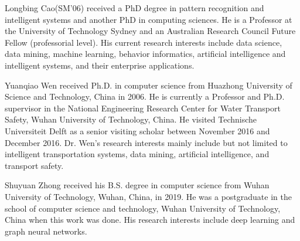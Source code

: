 \documentclass[journal]{IEEEtran}
\begin{document}
\begin{IEEEbiography}{Longbing Cao}(SM'06) received a PhD degree in pattern recognition and intelligent systems and another PhD in computing sciences. He is a Professor at the University of Technology Sydney and an Australian Research Council Future Fellow (professorial level). His current research interests include data science, data mining, machine learning, behavior informatics, artificial intelligence and intelligent systems, and their enterprise applications.
\end{IEEEbiography}

\begin{IEEEbiography}{Yuanqiao Wen} received Ph.D. in computer science from Huazhong University of Science and Technology, China in 2006. He is currently a Professor and Ph.D. supervisor in the National Engineering Research Center for Water Transport Safety, Wuhan University of Technology, China. He visited Technische Universiteit Delft as a senior visiting scholar between November 2016 and December 2016. Dr. Wen’s research interests mainly include but not limited to intelligent transportation systems, data mining, artificial intelligence, and transport safety.
\end{IEEEbiography}

\begin{IEEEbiography}{Shuyuan Zhong} received his B.S. degree in computer science from Wuhan University of Technology, Wuhan, China, in 2019. He was a postgraduate in the school of computer science and technology, Wuhan University of Technology, China when this work was done. His research interests include deep learning and graph neural networks.
\end{IEEEbiography}
\end{document}
